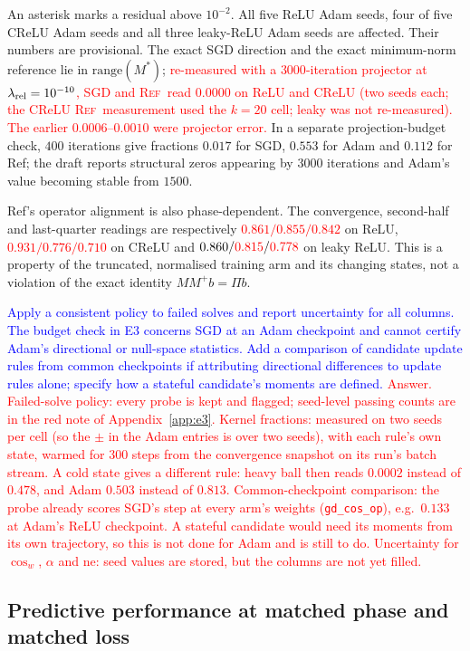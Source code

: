 \documentclass{article}
\newcommand{\zied}[1]{\textcolor{blue}{#1}}
\newcommand{\nat}[1]{\textcolor{red}{#1}}
\newcommand{\TOU}{\textsc{Ref}}
\theoremstyle{definition}
\theoremstyle{remark}
\begin{document}
An asterisk marks a residual above $10^{-2}$. All five ReLU Adam seeds, four of five CReLU Adam seeds and all three leaky-ReLU Adam seeds are affected. Their numbers are provisional. The exact SGD direction and the exact minimum-norm reference lie in $\mathrm{range}(M^*)$; \nat{re-measured with a $3000$-iteration projector at $\lambda_{\rm rel}=10^{-10}$, SGD and \TOU\ read $0.0000$ on ReLU and CReLU (two seeds each; the CReLU \TOU\ measurement used the $k=20$ cell; leaky was not re-measured). The earlier $0.0006$--$0.0010$ were projector error.} In a separate projection-budget check, $400$ iterations give fractions $0.017$ for SGD, $0.553$ for Adam and $0.112$ for Ref; the draft reports structural zeros appearing by $3000$ iterations and Adam's value becoming stable from $1500$.

Ref's operator alignment is also phase-dependent. The convergence, second-half and last-quarter readings are respectively \nat{$0.861/0.855/0.842$} on ReLU, \nat{$0.931/0.776/0.710$} on CReLU and $0.860/\nat{0.815}/\nat{0.778}$ on leaky ReLU. This is a property of the truncated, normalised training arm and its changing states, not a violation of the exact identity $MM^+b=\Pi b$.

\zied{Apply a consistent policy to failed solves and report uncertainty for all columns. The budget check in E3 concerns SGD at an Adam checkpoint and cannot certify Adam's directional or null-space statistics. Add a comparison of candidate update rules from common checkpoints if attributing directional differences to update rules alone; specify how a stateful candidate's moments are defined.}
\nat{Answer. Failed-solve policy: every probe is kept and flagged; seed-level passing counts are in the red note of Appendix~\ref{app:e3}. Kernel fractions: measured on two seeds per cell (so the $\pm$ in the Adam entries is over two seeds), with each rule's own state, warmed for $300$ steps from the convergence snapshot on its run's batch stream. A cold state gives a different rule: heavy ball then reads $0.0002$ instead of $0.478$, and Adam $0.503$ instead of $0.813$. Common-checkpoint comparison: the probe already scores SGD's step at every arm's weights (\texttt{gd\_cos\_op}), e.g.\ $0.133$ at Adam's ReLU checkpoint. A stateful candidate would need its moments from its own trajectory, so this is not done for Adam and is still to do. Uncertainty for $\cos_w$, $\alpha$ and $\mathrm{ne}$: seed values are stored, but the columns are not yet filled.}

\subsection{Predictive performance at matched phase and matched loss}\label{app:e5}
\end{document}
